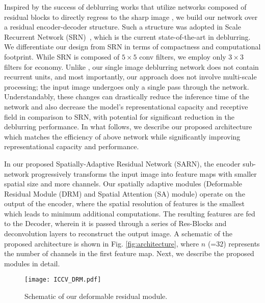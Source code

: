 \documentclass[10pt,twocolumn,letterpaper]{article}
\begin{document}
Inspired by the success of deblurring works that utilize networks composed of residual blocks to directly regress to the sharp image \cite{nimisha2017blur,nah2017deep,tao2018scale}, we build our network over a residual encoder-decoder structure. Such a structure was adopted in Scale Recurrent Network (SRN)~\cite{tao2018scale}, which is the current state-of-the-art in deblurring. We differentiate our design from SRN in terms of compactness and computational footprint. While SRN is composed of $5\times5$ conv filters, we employ only $3\times3$ filters for economy. Unlike \cite{tao2018scale}, our single image deblurring network does not contain recurrent units, and most importantly, our approach does not involve multi-scale processing; the input image undergoes only a single pass through the network. Understandably, these changes can drastically reduce the inference time of the network and also decrease the model's representational capacity and receptive field in comparison to SRN, with potential for significant reduction in the deblurring performance. In what follows, we describe our proposed architecture which matches the efficiency of above network while significantly improving representational capacity and performance.

In our proposed Spatially-Adaptive Residual Network (SARN), the encoder sub-network progressively transforms the input image into feature maps with smaller spatial size and more channels. Our spatially adaptive modules (Deformable Residual Module (DRM) and Spatial Attention (SA) module) operate on the output of the encoder, where the spatial resolution of features is the smallest which leads to minimum additional computations. The resulting features are fed to the Decoder, wherein it is passed through a series of Res-Blocks and deconvolution layers to reconstruct the output image. A schematic of the proposed architecture is shown in Fig. \ref{fig:architecture}, where $n$ (=$32$) represents the number of channels in the first feature map. Next, we describe the proposed modules in detail.



\begin{figure}[]
\centering
\texttt{[image: ICCV\_DRM.pdf]}\caption{Schematic of our deformable residual module.}
\label{fig:deformableblock}
\end{figure}
\end{document}
